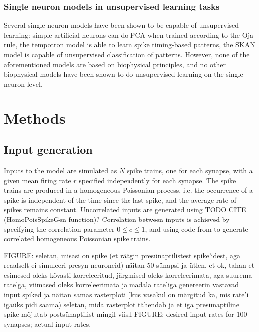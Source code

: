 \documentclass[a4paper,12pt]{report}
\theoremstyle{definition}
\begin{document}


\subsection{Single neuron models in unsupervised learning tasks}

Several single neuron models have been shown to be capable of unsupervised learning: simple artificial neurons can do PCA when trained according to the Oja rule, the tempotron model \cite{gutig2006tempotron} is able to learn spike timing-based patterns, the SKAN model \cite{afshar2014racing} is capable of unsupervised classification of patterns. However, none of the aforementioned models are based on biophysical principles, and no other biophysical models have been shown to do unsupervised learning on the single neuron level.





\chapter{Methods}

\section{Input generation}
Inputs to the model are simulated as $N$ spike trains, one for each synapse, with a given mean firing rate $r$ specified independently for each synapse. The spike trains are produced in a homogeneous Poissonian process, i.e. the occurrence of a spike is independent of the time since the last spike, and the average rate of spikes remains constant. Uncorrelated inputs are generated using TODO CITE (HomoPoisSpikeGen function)?
Correlation between inputs is achieved by specifying the correlation parameter $0 \leq c \leq 1$, and using code from \cite{macke2009} to generate correlated homogeneous Poissonian spike trains.

FIGURE: seletan, misasi on spike (et räägin presünaptilistest spike'idest, aga reaalselt ei simuleeri presyn neuroneid)
    näitan 50 sünapsi ja ütlen, et ok, tahan et esimesed oleks kõvasti korreleeritud, järgmised oleks korreleerimata, aga suurema rate'ga, viimased oleks korreleerimata ja madala rate'iga
    genereerin vastavad input spiked ja näitan samas rasterploti (kus vasakul on märgitud ka, mis rate'i igaüks pidi saama)
    seletan, mida rasterplot tähendab ja et iga presünaptiline spike mõjutab postsünaptilist mingil viisil
FIGURE: desired input rates for 100 synapses; actual input rates.
\end{document}

